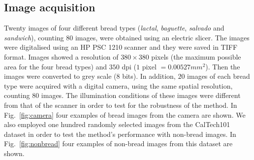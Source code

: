 \documentclass[oneside,a4paper,english,links]{article}
\begin{document}
\subsection{Image acquisition}
Twenty images of four different bread types ({\em lactal}, {\em baguette}, {\em salvado} and {\em sandwich}), counting $80$ images, were obtained using an electric slicer. The images were digitalised using an HP PSC 1210 scanner and they were saved in TIFF format. Images showed a resolution of $380 \times 380$ pixels (the maximum possible area for the four bread types) and $350$ dpi ($1$ pixel $= 0.00527 mm^{2}$). Then the images were converted to grey scale ($8$ bits). In addition, $20$ images of each bread type were acquired with a digital camera, using the same spatial resolution, counting $80$ images. The illumination conditions of these images were different from that of the scanner in order to test for the robustness of the method. In Fig.~\ref{fig:camera} four examples of bread images from the camera are shown. We also employed one hundred randomly selected images from the CalTech101~\cite{FeiFei04} dataset in order to test the method's performance with non-bread images. In Fig.~\ref{fig:nonbread} four examples of non-bread images from this dataset are shown. 
\end{document}
